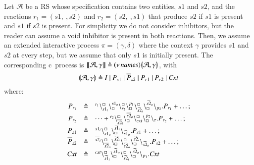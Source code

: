 \begin{example}\label{ex:backbone}
 Let ${\cal A}$ be a RS whose specification contains two entities, $s1$ and $s2$, and the reactions $r_1=(s1,\ , s2)$ and $r_2 = (s2, \ , s1)$ that produce $s2$ if $s1$ is present and $s1$ if $s2$ is present. For simplicity we do not consider inhibitors, but the reader can assume a void inhibitor is present in both reactions. Then, we assume an  extended interactive process $\pi=(\gamma,\delta)$ where the context $\gamma$ provides  $s1$ and $s2$ at every step, but we assume that only $s1$ is initially present. The corresponding c\CNA \ process is $\llbracket{\cal A},\gamma\rrbracket \triangleq (\nu\, \mathit{names}) \llparenthesis{\cal A},\gamma\rrparenthesis$, with 
$$
\llparenthesis{\cal A},\gamma\rrparenthesis \triangleq 
I ~|~ P_{s1}~|~\overline{P}_{s2}~|~ P_{r1}~|~P_{r2}~|~\mathit{Cxt}
$$
 where:
 \[
 \begin{array}{rcl}
 P_{r_1} &\triangleq& {}^{r_1}\backslash_{s1_i}^{\scriptstyle {\square}}\backslash_{\scriptstyle {\square}}^{s1_o}\backslash_{r_2}^{\scriptstyle {\square}} \backslash_{\scriptstyle {\square}}^{p_1}\backslash_{\widetilde{s2}_i}^{\scriptstyle {\square}}\backslash_{\scriptstyle {\square}}^{\widetilde{s2}_o}\backslash_{p_2}.P_{r_1} + \dots;   \\
  P_{r_2} &\triangleq& \dots + {}^{r_2}\backslash_{\overline{s2}_i}^{\scriptstyle {\square}}\backslash_{\scriptstyle {\square}}^{\overline{s2}_o}\backslash_{\mathit{cxt}}^{\scriptstyle {\square}} \backslash_{\scriptstyle {\square}}^{p_2}\backslash_{\tau}.P_{r_2} + \dots; \\
   P_{s1} &\triangleq& {}^{s1_i}\backslash_{s1_o}^{\scriptstyle {\square}}\backslash_{\scriptstyle {\square}}^{\widehat{s1}_i}\backslash_{\widehat{s1}_o}
 .P_{s1} + \dots; \\
  \overline{P}_{s2} &\triangleq& {}^{\overline{s2}_i}\backslash_{\overline{s2}_o}^{\scriptstyle {\square}}
   \backslash_{\scriptstyle {\square}}^{\widehat{s2}_i}\backslash_{\widehat{s2}_o}^{\scriptstyle {\square}}\backslash_{\scriptstyle {\square}}^{\widetilde{s2}_i}\backslash_{\widetilde{s2}_o}.P_{s2} + \dots;\\
 \mathit{Cxt}& \triangleq & {}^{\mathit{cxt}}\backslash_{\widehat{s1}_i}^{\scriptstyle {\square}}\backslash_{\scriptstyle {\square}}^{\widehat{s1}_o}
  \backslash_{\widehat{s2}_i}^{\scriptstyle {\square}}\backslash_{\scriptstyle {\square}}^{\widehat{s2}_o}\backslash_{p_1}.\mathit{Cxt}

\end{array}\]
\end{example}
